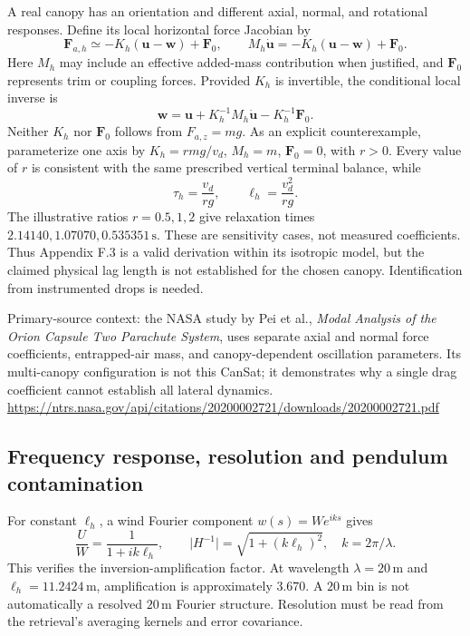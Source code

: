 A real canopy has an orientation and different axial, normal, and rotational
responses. Define its local horizontal force Jacobian by
\begin{equation}
 \boldsymbol F_{a,h}\simeq
 -K_h(\boldsymbol u-\boldsymbol w)+\boldsymbol F_0,
 \qquad
 M_h\dot{\boldsymbol u}
 =-K_h(\boldsymbol u-\boldsymbol w)+\boldsymbol F_0.
\end{equation}
Here $M_h$ may include an effective added-mass contribution when justified,
and $\boldsymbol F_0$ represents trim or coupling forces. Provided $K_h$ is
invertible, the conditional local inverse is
\begin{equation}
 \boldsymbol w=\boldsymbol u+K_h^{-1}M_h\dot{\boldsymbol u}
                            -K_h^{-1}\boldsymbol F_0.
\end{equation}
Neither $K_h$ nor $\boldsymbol F_0$ follows from $F_{a,z}=mg$.
As an explicit counterexample, parameterize one axis by
$K_h=rmg/v_d$, $M_h=m$, $\boldsymbol F_0=0$, with $r>0$.
Every value of $r$ is consistent with the same prescribed vertical
terminal balance, while
\begin{equation}
 \tau_h=\frac{v_d}{rg},\qquad \ell_h=\frac{v_d^2}{rg}.
\end{equation}
The illustrative ratios $r=0.5,1,2$ give relaxation times
$2.14140,1.07070,0.535351\,\mathrm s$. These are sensitivity cases, not
measured coefficients. Thus Appendix F.3 is a valid derivation within its
isotropic model, but the claimed physical lag length is not established for
the chosen canopy. Identification from instrumented drops is needed.

Primary-source context: the NASA study by Pei et al., \emph{Modal Analysis
of the Orion Capsule Two Parachute System}, uses separate axial and normal
force coefficients, entrapped-air mass, and canopy-dependent oscillation
parameters. Its multi-canopy configuration is not this CanSat; it demonstrates
why a single drag coefficient cannot establish all lateral dynamics.
\url{https://ntrs.nasa.gov/api/citations/20200002721/downloads/20200002721.pdf}

\subsection{Frequency response, resolution and pendulum contamination}

For constant $\ell_h$, a wind Fourier component $w(s)=W e^{iks}$ gives
\begin{equation}
 \frac{U}{W}=\frac{1}{1+ik\ell_h},\qquad
 \lvert H^{-1}\rvert=\sqrt{1+(k\ell_h)^2},\quad k=2\pi/\lambda.
\end{equation}
This verifies the inversion-amplification factor. At wavelength
$\lambda=20\,\mathrm m$ and $\ell_h=11.2424\,\mathrm m$, amplification
is approximately $3.670$. A $20\,\mathrm m$ bin is not automatically a
resolved $20\,\mathrm m$ Fourier structure. Resolution must be read from
the retrieval's averaging kernels and error covariance.

